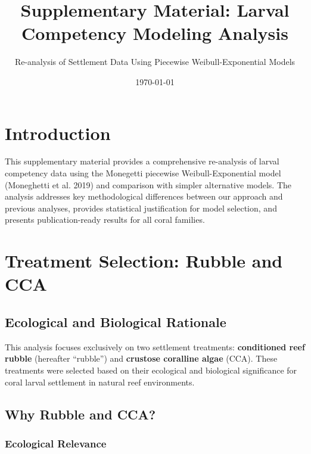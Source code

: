 \documentclass[11pt]{article}
\title{Supplementary Material: Larval Competency Modeling Analysis}
\author{Re-analysis of Settlement Data Using Piecewise Weibull-Exponential Models}
\date{\today}
\begin{document}
\maketitle

\section{Introduction}

This supplementary material provides a comprehensive re-analysis of larval competency data using the Monegetti piecewise Weibull-Exponential model (Moneghetti et al. 2019) and comparison with simpler alternative models. The analysis addresses key methodological differences between our approach and previous analyses, provides statistical justification for model selection, and presents publication-ready results for all coral families.

\section{Treatment Selection: Rubble and CCA}

\subsection{Ecological and Biological Rationale}

This analysis focuses exclusively on two settlement treatments: \textbf{conditioned reef rubble} (hereafter ``rubble'') and \textbf{crustose coralline algae} (CCA). These treatments were selected based on their ecological and biological significance for coral larval settlement in natural reef environments.

\subsection{Why Rubble and CCA?}

\subsubsection{Ecological Relevance}
\end{document}
